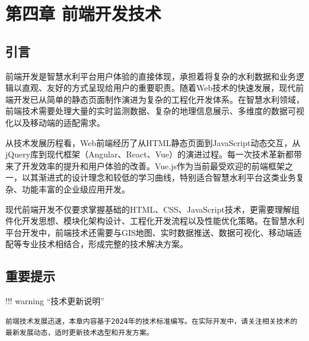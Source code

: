\hypertarget{ux7b2cux56dbux7ae0-ux524dux7aefux5f00ux53d1ux6280ux672f}{%
\section{第四章 前端开发技术}\label{ux7b2cux56dbux7ae0-ux524dux7aefux5f00ux53d1ux6280ux672f}}


\hypertarget{ux5f15ux8a00}{%
\subsection{引言}\label{ux5f15ux8a00}}

前端开发是智慧水利平台用户体验的直接体现，承担着将复杂的水利数据和业务逻辑以直观、友好的方式呈现给用户的重要职责。随着Web技术的快速发展，现代前端开发已从简单的静态页面制作演进为复杂的工程化开发体系。在智慧水利领域，前端技术需要处理大量的实时监测数据、复杂的地理信息展示、多维度的数据可视化以及移动端的适配需求。

从技术发展历程看，Web前端经历了从HTML静态页面到JavaScript动态交互，从jQuery库到现代框架（Angular、React、Vue）的演进过程。每一次技术革新都带来了开发效率的提升和用户体验的改善。Vue.js作为当前最受欢迎的前端框架之一，以其渐进式的设计理念和较低的学习曲线，特别适合智慧水利平台这类业务复杂、功能丰富的企业级应用开发。

现代前端开发不仅要求掌握基础的HTML、CSS、JavaScript技术，更需要理解组件化开发思想、模块化架构设计、工程化开发流程以及性能优化策略。在智慧水利平台开发中，前端技术还需要与GIS地图、实时数据推送、数据可视化、移动端适配等专业技术相结合，形成完整的技术解决方案。

\hypertarget{ux91cdux8981ux63d0ux793a}{%
\subsection{重要提示}\label{ux91cdux8981ux63d0ux793a}}

!!! warning ``技术更新说明''

\begin{verbatim}
前端技术发展迅速，本章内容基于2024年的技术标准编写。在实际开发中，请关注相关技术的最新发展动态，适时更新技术选型和开发方案。
\end{verbatim}

